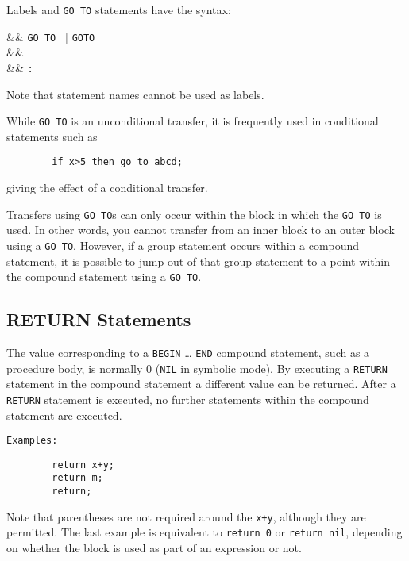 Labels and \texttt{GO TO} statements have the syntax:
\begin{syntaxtable}
   &\bnfprod& \texttt{GO TO }  | 
                                    \texttt{GOTO }  \\
   &\bnfprod& \\
   &\bnfprod& \texttt{:}
\end{syntaxtable}
Note that statement names cannot be used as labels.

While \texttt{GO TO} is an unconditional transfer, it is frequently used
in conditional statements such as
\begin{verbatim}
        if x>5 then go to abcd;
\end{verbatim}
giving the effect of a conditional transfer.

Transfers using \texttt{GO TO}s can only occur within the block in which the
\texttt{GO TO} is used.  In other words, you cannot transfer from an inner
block to an outer block using a \texttt{GO TO}.  However, if a group statement
occurs within a compound statement, it is possible to jump out of that group
statement to a point within the compound statement using a \texttt{GO TO}.

\subsection{RETURN Statements}
\hypertarget{command:RETURN}{}

The value corresponding to a \texttt{BEGIN} \ldots{} \texttt{END} compound
statement,
 such as a procedure body, is normally 0
(\texttt{NIL} in symbolic mode).  By executing a \texttt{RETURN}
statement in the compound statement a different value can be returned.
After a \texttt{RETURN} statement is executed, no further statements within
the compound statement are executed.

\texttt{Examples:}
\begin{verbatim}
        return x+y;
        return m;
        return;
\end{verbatim}
Note that parentheses are not required around the \texttt{x+y}, although they
are permitted.  The last example is equivalent to \texttt{return 0} or 
\texttt{return nil}, depending on whether the block is used as part of an
expression or not.

